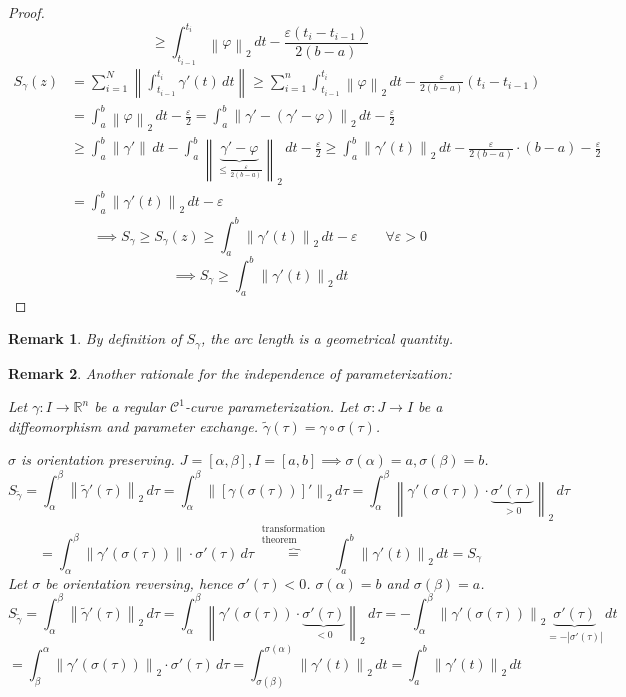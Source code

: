 \documentclass{article}
\newtheorem{remark}{Remark}  \numberwithin{remark}{section}
\newcommand{\norm}[1]{\left\|#1\right\|}
\newcommand{\card}[1]{\left|#1\right|}
\begin{document}
\begin{proof}
\[     \geq \int_{t_{i-1}}^{t_i} \norm{\varphi}_2 \, dt - \frac{\varepsilon (t_i - t_{i-1})}{2 (b - a)} \]
  \begin{align*}
    S_\gamma(z) &= \sum_{i=1}^N \norm{\int_{t_{i-1}}^{t_i} \gamma'(t) \, dt}
                \geq \sum_{i=1}^n \int_{t_{i-1}}^{t_i} \norm{\varphi}_2 \, dt - \frac{\varepsilon}{2(b - a)} (t_i - t_{i-1}) \\
                &= \int_a^b \norm{\varphi}_2 \, dt - \frac{\varepsilon}{2}
                = \int_a^b \norm{\gamma' - (\gamma' - \varphi)}_2 \, dt - \frac\varepsilon2 \\
                &\geq \int_a^b \norm{\gamma'} \, dt - \int_a^b \norm{\underbrace{\gamma' - \varphi}_{\leq \frac\varepsilon{2 (b - a)}}}_2 \, dt - \frac\varepsilon2
                \geq \int_a^b \norm{\gamma'(t)}_2 \, dt - \frac\varepsilon{2(b - a)} \cdot (b - a) - \frac\varepsilon2 \\
                &= \int_a^b \norm{\gamma'(t)}_2 \, dt - \varepsilon
  \end{align*}
  \[ \implies S_\gamma \geq S_\gamma(z) \geq \int_a^b \norm{\gamma'(t)}_2  \, dt - \varepsilon \qquad \forall \varepsilon > 0 \]
  \[ \implies S_\gamma \geq \int_a^b \norm{\gamma'(t)}_2 \, dt \]
\end{proof}

\begin{remark}
  By definition of $S_\gamma$, the arc length is a geometrical quantity.
\end{remark}

\begin{remark}
  Another rationale for the independence of parameterization:

  Let $\gamma: I \to \mathbb R^n$ be a regular $\mathcal C^1$-curve parameterization.
  Let $\sigma: J \to I$ be a diffeomorphism and parameter exchange.
  $\tilde\gamma(\tau) = \gamma \circ \sigma(\tau)$.

  $\sigma$ is orientation preserving. $J = [\alpha, \beta], I = [a,b] \implies \sigma(\alpha) = a, \sigma(\beta) = b$.
  \[ S_{\tilde\gamma} = \int_\alpha^\beta \norm{\tilde\gamma'(\tau)}_2 \, d\tau = \int_\alpha^\beta \norm{[\gamma(\sigma(\tau))]'}_2 \, d\tau = \int_\alpha^\beta \norm{\gamma'(\sigma(\tau)) \cdot \underbrace{\sigma'(\tau)}_{> 0}}_2 \, d\tau \]
  \[ = \int_\alpha^\beta \norm{\gamma'(\sigma(\tau))} \cdot \sigma'(\tau) \, d\tau \overbrace{=}^{\substack{\text{transformation} \\ \text{theorem}}} \int_a^b \norm{\gamma'(t)}_2 \, dt = S_\gamma \]
  Let $\sigma$ be orientation reversing, hence $\sigma'(\tau) < 0$. $\sigma(\alpha) = b$ and $\sigma(\beta) = a$.
  \[ S_{\tilde\gamma} = \int_{\alpha}^\beta \norm{\tilde\gamma'(\tau)}_2 \, d\tau = \int_{\alpha}^{\beta} \norm{\gamma'(\sigma(\tau)) \cdot \underbrace{\sigma'(\tau)}_{< 0}}_2 \, d\tau = -\int_{\alpha}^{\beta} \norm{\gamma'(\sigma(\tau))}_2 \underbrace{\sigma'(\tau)}_{= -\card{\sigma'(\tau)}} \, dt \]
  \[ = \int_\beta^\alpha \norm{\gamma'(\sigma(\tau))}_2 \cdot \sigma'(\tau) \, d\tau = \int_{\sigma(\beta)}^{\sigma(\alpha)} \norm{\gamma'(t)}_2 \, dt = \int_a^b \norm{\gamma'(t)}_2 \, dt \]
\end{remark}
\end{document}
